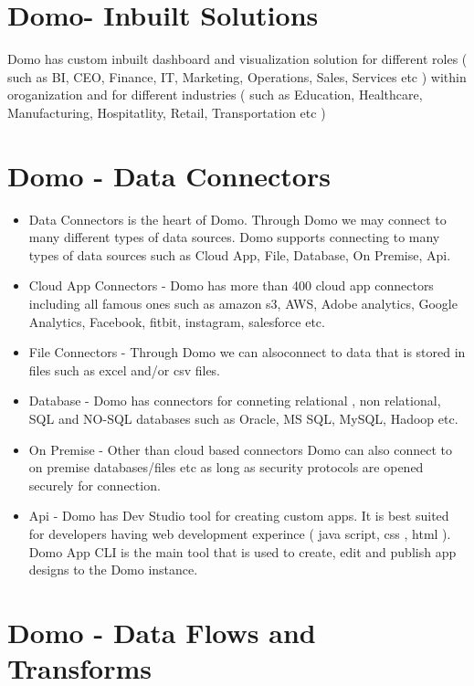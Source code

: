\section{Domo- Inbuilt Solutions}

Domo has custom inbuilt dashboard and visualization solution 
for different roles ( such as BI, CEO, Finance, IT, Marketing, 
Operations, Sales, Services etc )  within oroganization and 
for different industries ( such as Education, Healthcare, 
Manufacturing, Hospitatlity, Retail, Transportation etc )


\section{Domo - Data Connectors}
\begin{itemize}
\item Data Connectors is the heart of Domo. Through Domo we may 
connect to many different types of data sources. Domo supports 
connecting to many types of data sources such as  Cloud App, 
File, Database, On Premise, Api.

\item Cloud App Connectors - Domo has  more than 400 cloud app 
connectors including all famous ones such as amazon s3, 
AWS, Adobe analytics, Google Analytics, Facebook, fitbit, 
instagram, salesforce etc. 

\item File Connectors - Through Domo we can alsoconnect to data 
that is stored in files such as excel and/or csv files.

\item Database - Domo has connectors for conneting relational ,
non relational, SQL and NO-SQL databases such as Oracle, 
MS SQL, MySQL, Hadoop etc.

\item On Premise - Other than cloud based connectors Domo can also 
connect to on premise databases/files etc as long as security 
protocols are opened securely for connection.

\item Api - Domo has Dev Studio tool for creating custom apps. 
It is best suited for developers having web development 
experince ( java script, css , html ). Domo App CLI is the 
main tool that is used to create, edit and publish app designs 
to the Domo instance.
\end{itemize}

\section{Domo - Data Flows and Transforms}

